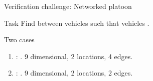 \begin{frame}{Verification challenge: Networked platoon}
\begin{alertblock}{Task}
Find  between vehicles such that vehicles .
\end{alertblock}
%
\begin{exampleblock}{Two cases}
\begin{enumerate}
\item {}: . {\color{violet} 9 dimensional, 2 locations, 4 edges}.
\item {}: . {\color{violet} 9 dimensional, 2 locations, 2 edges}.
\end{enumerate}
\end{exampleblock}
\end{frame}

